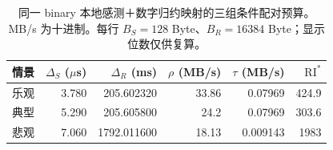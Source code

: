 \begin{table}[htbp]\centering\small
\begin{tabular}{@{}lrrrrr@{}}\toprule
情景 & $\Delta_S$ ($\mu$s) & $\Delta_R$ (ms) & $\rho$ (MB/s) & $\tau$ (MB/s) & $\mathrm{RI}^{*}$\\\midrule
乐观 & 3.780 & 205.602320 & 33.86 & 0.07969 & 424.9\\
典型 & 5.290 & 205.605800 & 24.2 & 0.07969 & 303.6\\
悲观 & 7.060 & 1792.011600 & 18.13 & 0.009143 & 1983\\
\bottomrule\end{tabular}
\caption{同一 binary 本地感测＋数字归约映射的三组条件配对预算。MB/s 为十进制。每行 $B_S=128$ Byte、$B_R=16384$ Byte；显示位数仅供复算。}\label{03_nor_2d:tab:nor-results}\end{table}
